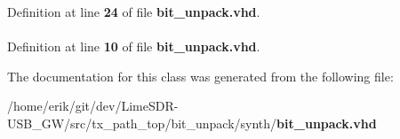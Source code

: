 Definition at line {\bf 24} of file {\bf bit\+\_\+unpack.\+vhd}.

\paragraph[{std\+\_\+logic\+\_\+1164}]{\hspace{0.3cm}{\ttfamily [Package]}}\label{classbit__unpack_acd03516902501cd1c7296a98e22c6fcb}


Definition at line {\bf 10} of file {\bf bit\+\_\+unpack.\+vhd}.



The documentation for this class was generated from the following file\+:\begin{DoxyCompactItemize}
\item 
/home/erik/git/dev/\+Lime\+S\+D\+R-\/\+U\+S\+B\+\_\+\+G\+W/src/tx\+\_\+path\+\_\+top/bit\+\_\+unpack/synth/{\bf bit\+\_\+unpack.\+vhd}\end{DoxyCompactItemize}
